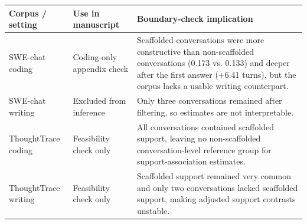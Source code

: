 \begin{table}[p]
\vspace{2pt}
\begin{tabularx}{\textwidth}{@{}>{\raggedright\arraybackslash}p{}>{\raggedright\arraybackslash}p{}>{\raggedright\arraybackslash}X@{}}
\toprule
Corpus / setting & Use in manuscript & Boundary-check implication \\
\midrule
SWE-chat coding & Coding-only appendix check & Scaffolded conversations were more constructive than non-scaffolded conversations (0.173 vs. 0.133) and deeper after the first answer (+6.41 turns), but the corpus lacks a usable writing counterpart. \\
SWE-chat writing & Excluded from inference & Only three conversations remained after filtering, so estimates are not interpretable. \\
ThoughtTrace coding & Feasibility check only & All conversations contained scaffolded support, leaving no non-scaffolded conversation-level reference group for support-association estimates. \\
ThoughtTrace writing & Feasibility check only & Scaffolded support remained very common and only two conversations lacked scaffolded support, making adjusted support contrasts unstable. \\
\bottomrule
\end{tabularx}
\end{table}
